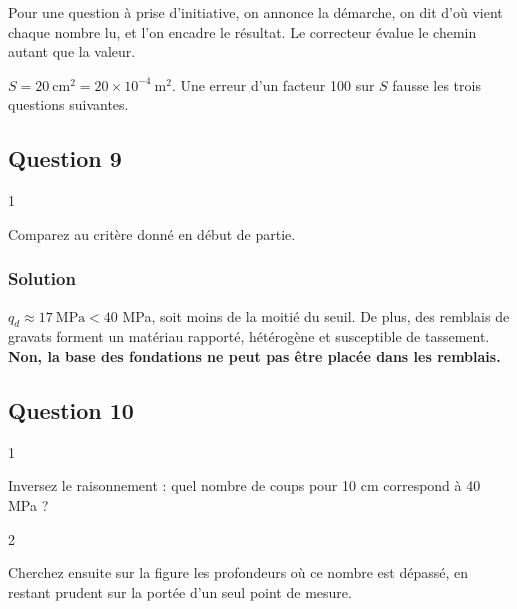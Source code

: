 \documentclass[11pt,a4paper]{article}
\begin{document}
\begin{methode}

Pour une question à prise d'initiative, on annonce la démarche, on dit d'où vient chaque nombre lu, et l'on encadre le résultat. Le correcteur évalue le chemin autant que la valeur.

\end{methode}

\begin{piege}

\(S = 20\ \mathrm{cm^2} = 20\times10^{-4}\ \mathrm{m^2}\). Une erreur d'un facteur 100 sur \(S\) fausse les trois questions suivantes.

\end{piege}

\hypertarget{question-9}{%
\subsection{Question 9}\label{question-9}}

\begin{indication}{1}

Comparez au critère donné en début de partie.

\end{indication}

\hypertarget{solution-8}{%
\subsubsection{Solution}\label{solution-8}}

\(q_d\approx17\ \mathrm{MPa} < 40\) MPa, soit moins de la moitié du seuil. De plus, des remblais de gravats forment un matériau rapporté, hétérogène et susceptible de tassement. \textbf{Non, la base des fondations ne peut pas être placée dans les remblais.}

\hypertarget{question-10}{%
\subsection{Question 10}\label{question-10}}

\begin{indication}{1}

Inversez le raisonnement : quel nombre de coups pour 10 cm correspond à 40 MPa ?

\end{indication}

\begin{indication}{2}

Cherchez ensuite sur la figure les profondeurs où ce nombre est dépassé, en restant prudent sur la portée d'un seul point de mesure.

\end{indication}
\end{document}
